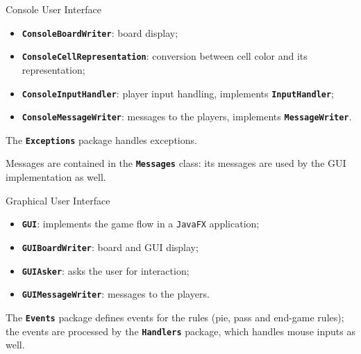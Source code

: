 \documentclass{beamer}
\begin{document}
  \begin{frame}{Console User Interface}

    \begin{itemize}
      \setlength\itemsep{1em}
      \item \textbf{\texttt{ConsoleBoardWriter}}: board display;
      \item \textbf{\texttt{ConsoleCellRepresentation}}: conversion between cell color and its representation;
      \item \textbf{\texttt{ConsoleInputHandler}}: player input handling, implements \textbf{\texttt{InputHandler}};
      \item \textbf{\texttt{ConsoleMessageWriter}}: messages to the players, implements \textbf{\texttt{MessageWriter}}.
    \end{itemize}

    \vspace{1em}

    The \textbf{\texttt{Exceptions}} package handles exceptions.

    \vspace{1em}

    Messages are contained in the \textbf{\texttt{Messages}} class: its messages are used by the GUI implementation as well.

  \end{frame}



  \begin{frame}{Graphical User Interface}

    \begin{itemize}
      \setlength\itemsep{1em}
      \item \textbf{\texttt{GUI}}: implements the game flow in a \texttt{JavaFX} application;
      \item \textbf{\texttt{GUIBoardWriter}}: board and GUI display;
      \item \textbf{\texttt{GUIAsker}}: asks the user for interaction;
      \item \textbf{\texttt{GUIMessageWriter}}: messages to the players.
    \end{itemize}

    \vspace{1em}

    The \textbf{\texttt{Events}} package defines events for the rules (pie, pass and end-game rules); the events are processed by the \textbf{\texttt{Handlers}} package, which handles mouse inputs as well.

  \end{frame}
\end{document}
